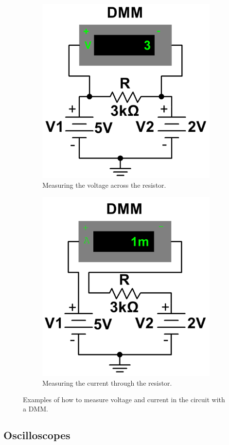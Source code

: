 \documentclass[12pt]{article}
\begin{document}
\begin{figure}[H]
\begin{subfigure}{.5\textwidth}
  \centering
  \includegraphics[width=0.6\linewidth]{photos/prelim/circuitschmeatic_voltage.PNG}
  \caption{Measuring the voltage across the resistor.}
\end{subfigure}%
\begin{subfigure}{.5\textwidth}
  \centering
  \includegraphics[width=0.6\linewidth]{photos/prelim/circuitschmeatic_current.PNG}
  \caption{Measuring the current through the resistor.}
\end{subfigure}
\caption{Examples of how to measure voltage and current in the circuit with a DMM.}
\end{figure}

\subsection{Oscilloscopes}
\end{document}
